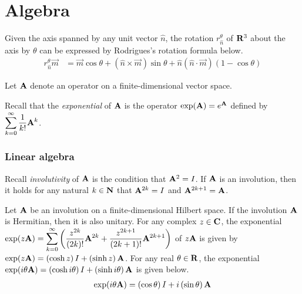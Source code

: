\section{Algebra}

Given the axis spanned by any unit vector $\hat{n}$, the rotation $r_{\hat{n}}^\theta$ of $\mathbf{R}^3$ about the axis by $\theta$ can be expressed by Rodrigues's rotation formula below.
\begin{align}\label{eqn:Rodrigues}
	r_{\hat{n}}^\theta \vec{m} & = \vec{m} \cos \theta + \left(\hat{n} \times \vec{m} \right) \sin \theta + \hat{n} \left(\hat{n} \cdot \vec{m}\right)\left(1 - \cos \theta\right)
\end{align}

Let $\mathbf{A}$ denote an operator on a finite-dimensional vector space.

Recall that the \emph{exponential} of $\mathbf{A}$ is the operator $\exp\!\left(\mathbf{A}\right) = e^{\mathbf{A}}$ defined by $\displaystyle \sum_{k=0}^\infty \frac{1}{k!} \mathbf{A}^k$.

\subsubsection*{Linear algebra}

Recall \emph{involutivity} of $\mathbf{A}$ is the condition that $\mathbf{A}^2 = I$.
If $\mathbf{A}$ is an involution, then it holds for any natural $k \in \mathbf{N}$ that $\mathbf{A}^{2 k} = I$ and $\mathbf{A}^{2 k + 1} = \mathbf{A}$.

Let $\mathbf{A}$ be an involution on a finite-dimensional Hilbert space.
If the involution $\mathbf{A}$ is Hermitian, then it is also unitary.
For any complex $z \in \mathbf{C}$, the exponential $\displaystyle \exp\!\left(z \mathbf{A}\right) = \sum_{k=0}^\infty \left(\frac{z^{2k}}{(2k)!} \mathbf{A}^{2k} + \frac{z^{2k+1}}{(2k+1)!} \mathbf{A}^{2k+1}\right)$ of $z \mathbf{A}$ is given by $\exp\!\left(z \mathbf{A}\right) = \left(\cosh z\right) I + \left(\sinh z\right) \mathbf{A}$.
For any real $\theta \in \mathbf{R}$, the exponential $\displaystyle \exp\!\left(i\theta \mathbf{A}\right) = \left(\cosh i \theta\right) I + \left(\sinh i \theta\right) \mathbf{A}$ is given below.
\begin{align}
	\exp\!\left(i \theta \mathbf{A}\right) = \left(\cos \theta\right) I + i \left(\sin \theta\right) \mathbf{A}
\end{align}

